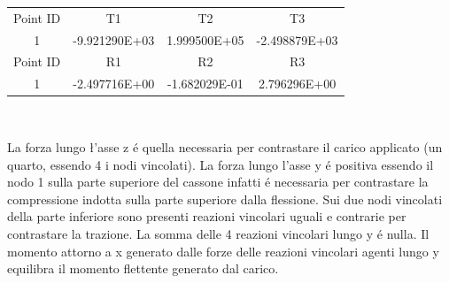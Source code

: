 \documentclass[12pt,a4paper]{article}
\begin{document}
\begin{center}
\begin{tabular}{c c c c}
\hline
Point ID& T1 & T2 & T3\\
1 & -9.921290E+03 & 1.999500E+05 & -2.498879E+03\\
\hline
Point ID & R1 & R2 & R3\\
1 & -2.497716E+00 &-1.682029E-01 & 2.796296E+00\\
\hline
\end{tabular}\\ 
\end{center}
La forza lungo \l'asse z \'e quella necessaria per contrastare il carico applicato (un quarto, essendo 4 i nodi
vincolati). La forza lungo l'asse y \'e positiva essendo il nodo 1 sulla parte superiore del cassone infatti \'e
necessaria per contrastare la compressione indotta sulla parte superiore dalla flessione. Sui due nodi vincolati
della parte inferiore sono presenti reazioni vincolari uguali e contrarie per contrastare la trazione. La somma
delle 4 reazioni vincolari lungo y \'e nulla. Il momento attorno a x generato dalle forze delle reazioni vincolari
agenti lungo y equilibra il momento flettente generato dal carico.
\end{document}
